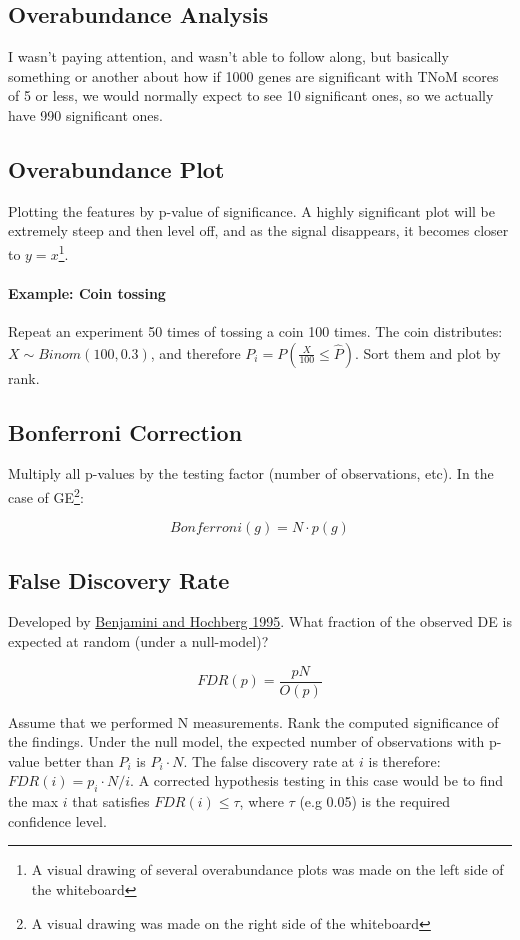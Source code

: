 \documentclass[a4paper]{article}
\begin{document}
\subsection{Overabundance Analysis}
I wasn't paying attention, and wasn't able to follow along, but basically something or another about how if 1000 genes are significant with TNoM scores of 5 or less, we would normally expect to see 10 significant ones, so we actually have 990 significant ones.

\subsection{Overabundance Plot}
Plotting the features by p-value of significance. A highly significant plot will be extremely steep and then level off, and as the signal disappears, it becomes closer to $y=x$\footnote{A visual drawing of several overabundance plots was made on the left side of the whiteboard}.

\paragraph{Example: Coin tossing}
Repeat an experiment 50 times of tossing a coin 100 times. The coin distributes: $X \sim Binom(100, 0.3)$, and therefore $P_i=P(\frac{X}{100} \le \hat{P})$. Sort them and plot by rank.


\subsection{Bonferroni Correction}
Multiply all p-values by the testing factor (number of observations, etc). In the case of GE\footnote{A visual drawing was made on the right side of the whiteboard}:

\[Bonferroni(g)=N\cdot p(g)\]

\subsection{False Discovery Rate}
Developed by \href{http://www.stat.purdue.edu/~doerge/BIOINFORM.D/FALL06/Benjamini%20and%20Y%20FDR.pdf}{Benjamini and Hochberg 1995}.
What fraction of the observed DE is expected at random (under a null-model)?

\[FDR(p)=\frac{pN}{O(p)}\]

Assume that we performed N measurements.
Rank the computed significance of the findings.
Under the null model, the expected number of observations with p-value better than $P_i$ is $P_i \cdot N$.
The false discovery rate at $i$ is therefore: $FDR(i)=p_i\cdot N / i$.
A corrected hypothesis testing in this case would be to find the max $i$ that satisfies $FDR(i) \le \tau$, where $\tau$ (e.g 0.05) is the required confidence level.
\end{document}
